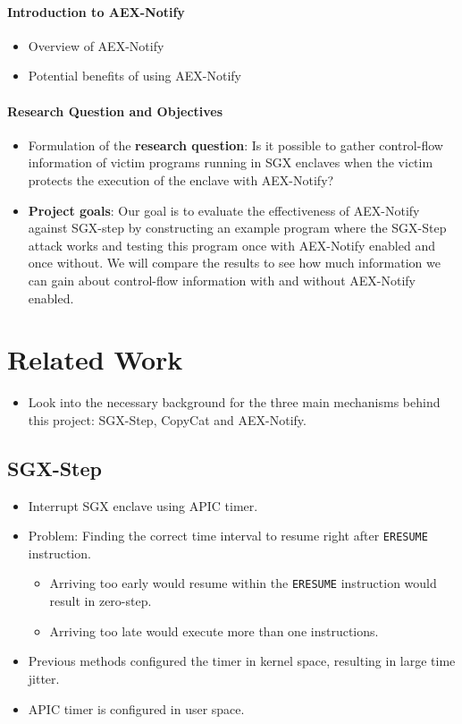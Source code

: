 \documentclass{llncs}
\begin{document}
\paragraph{Introduction to AEX-Notify}
\begin{itemize}
  \item Overview of AEX-Notify
  \item Potential benefits of using AEX-Notify
\end{itemize}

\paragraph{Research Question and Objectives}
\begin{itemize}
  \item Formulation of the \textbf{research question}:
    Is it possible to gather control-flow information of victim programs running
    in SGX enclaves when the victim protects the execution of the enclave with
    AEX-Notify?
  \item \textbf{Project goals}:
    Our goal is to evaluate the effectiveness of AEX-Notify against SGX-step by
    constructing an example program where the SGX-Step attack works and testing
    this program once with AEX-Notify enabled and once without. We will compare
    the results to see how much information we can gain about control-flow
    information with and without AEX-Notify enabled.
\end{itemize}

\section{Related Work}
\begin{itemize}
  \item
    Look into the necessary background for the three main mechanisms
    behind this project: SGX-Step, CopyCat and AEX-Notify.
\end{itemize}

\subsection{SGX-Step}
\begin{itemize}
  \item Interrupt SGX enclave using APIC timer.
  \item Problem: Finding the correct time interval to resume right after
    \texttt{ERESUME} instruction.
    \begin{itemize}
      \item Arriving too early would resume within the \texttt{ERESUME}
        instruction would result in zero-step.
      \item Arriving too late would execute more than one instructions.
    \end{itemize}
  \item Previous methods configured the timer in kernel space, resulting in
    large time jitter.
  \item APIC timer is configured in user space.
\end{itemize}
\end{document}
